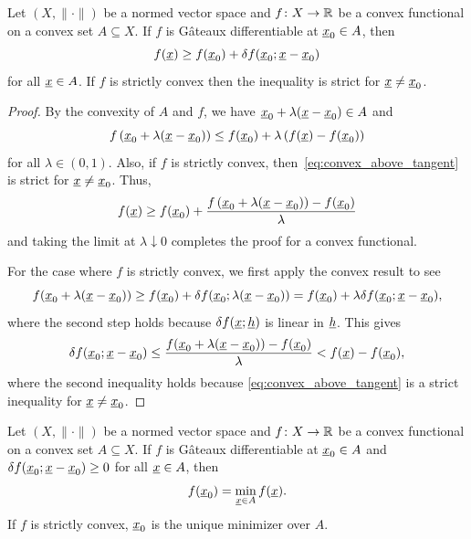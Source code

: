 \begin{theorem}
\label{theorem:convex_above_tangent}
Let $(X,\|\cdot\|)$ be a normed vector space and $f \colon X \rightarrow \mathbb{R}$ be a convex functional on a convex set $A \subseteq X$.
If $f$ is G\^{a}teaux differentiable at $\underline{x}_0 \in A$, then
\[ f(\underline{x}) \geq f(\underline{x}_0) + \delta f (\underline{x}_0;\underline{x}-\underline{x}_0) \]
for all $\underline{x}\in A$.
If $f$ is strictly convex then the inequality is strict for $\underline{x}\neq \underline{x}_0$.
\end{theorem}
\begin{proof}
By the convexity of $A$ and $f$, we have $\underline{x}_0 + \lambda (\underline{x}- \underline{x}_0) \in A$ and
\begin{equation} \label{eq:convex_above_tangent}
f \left(\underline{x}_0 + \lambda (\underline{x}-\underline{x}_0) \right) \leq f(\underline{x}_0) + \lambda \left( f(\underline{x}) - f(\underline{x}_0) \right)
\end{equation}
for all $\lambda\in (0,1)$.
Also, if $f$ is strictly convex, then~\eqref{eq:convex_above_tangent} is strict for $\underline{x} \neq \underline{x}_0$.
Thus,
\[  f(\underline{x}) \geq f(\underline{x}_0) + \frac{f \left(\underline{x}_0 + \lambda (\underline{x}-\underline{x}_0) \right)- f(\underline{x}_0)}{\lambda} \]
and taking the limit at $\lambda \downarrow 0$ completes the proof for a convex functional.

For the case where $f$ is strictly convex, we first apply the convex result to see
\[ f(\underline{x}_0 + \lambda(\underline{x}- \underline{x}_0)) \geq f(\underline{x}_0) + \delta f (\underline{x}_0;\lambda(\underline{x}-\underline{x}_0)) = f(\underline{x}_0) + \lambda \delta f (\underline{x}_0;\underline{x}-\underline{x}_0), \]
where the second step holds because $\delta f (\underline{x};\underline{h})$ is linear in $\underline{h}$.
This gives
\[ \delta f (\underline{x}_0;\underline{x}-\underline{x}_0)
\leq \frac{f(\underline{x}_0 + \lambda(\underline{x}- \underline{x}_0)) - f(\underline{x}_0)}{\lambda}
< f(\underline{x}) - f(\underline{x}_0), \]
where the second inequality holds because \eqref{eq:convex_above_tangent} is a strict inequality for $\underline{x} \neq \underline{x}_0$.
\end{proof}

\begin{corollary}
Let $(X,\|\cdot\|)$ be a normed vector space and $f \colon X \rightarrow \mathbb{R}$ be a convex functional on a convex set $A \subseteq X$.
If $f$ is G\^{a}teaux differentiable at $\underline{x}_0 \in A$ and $\delta f (\underline{x}_0;\underline{x}-\underline{x}_0) \geq 0$ for all $\underline{x} \in A$, then
\[ f(\underline{x}_0) = \min_{\underline{x}\in A} f(\underline{x}). \]
If $f$ is strictly convex, $\underline{x}_0$ is the unique minimizer over $A$.
\end{corollary}

